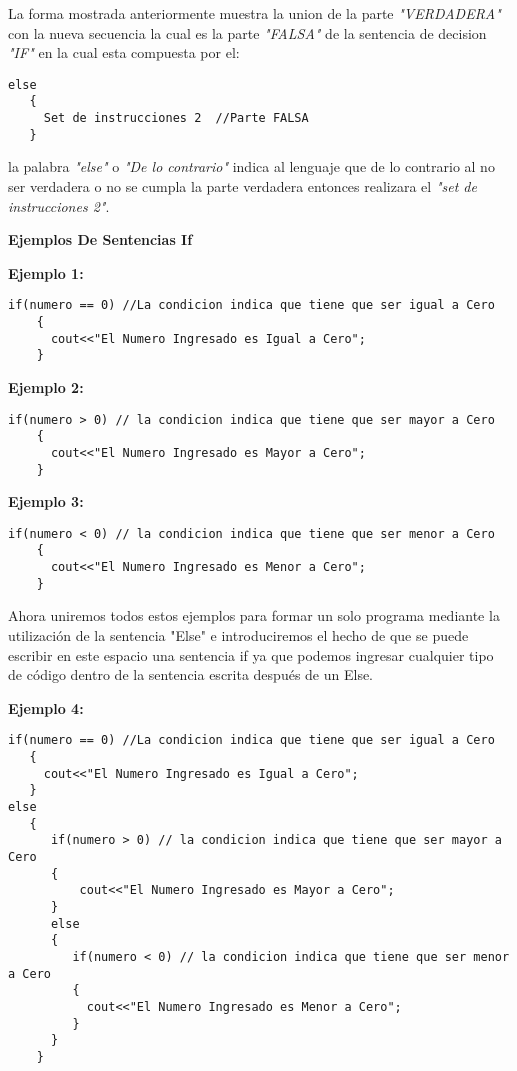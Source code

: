 La forma mostrada anteriormente muestra la union de la parte \textit{"VERDADERA"} con la nueva secuencia la cual es la parte \textit{"FALSA"} de la sentencia de decision \textit{"IF"} en la cual esta compuesta por el:

\begin{lstlisting}[style=Cpp, label=sintaxis-else, caption=Sintaxis Else]
else
   {
     Set de instrucciones 2  //Parte FALSA
   }
\end{lstlisting}

la palabra \textit{"else"} o \textit{"De lo contrario"} indica al lenguaje que de lo contrario al no ser verdadera o no se cumpla la parte verdadera entonces realizara el \textit{"set de instrucciones 2"}.

\begin{center}
	\textbf{Ejemplos De Sentencias If}
\end{center}

\textbf{Ejemplo 1:}

\begin{lstlisting}[style=Cpp, label=if-ejemplo-1, caption=If Ejemplo 1]
if(numero == 0) //La condicion indica que tiene que ser igual a Cero
    {
      cout<<"El Numero Ingresado es Igual a Cero";
    }
\end{lstlisting}

\textbf{Ejemplo 2:}

\begin{lstlisting}[style=Cpp, label=if-ejemplo-2, caption=If Ejemplo 2]
if(numero > 0) // la condicion indica que tiene que ser mayor a Cero
    {    
      cout<<"El Numero Ingresado es Mayor a Cero";
    }
\end{lstlisting}

\textbf{Ejemplo 3:}

\begin{lstlisting}[style=Cpp, label=if-ejemplo-3, caption=If Ejemplo 3]
if(numero < 0) // la condicion indica que tiene que ser menor a Cero
    {    
      cout<<"El Numero Ingresado es Menor a Cero";
    }
\end{lstlisting}

Ahora uniremos todos estos ejemplos para formar un solo programa mediante la utilización de la sentencia "Else" e introduciremos el hecho de que se puede escribir en este espacio una sentencia if ya que podemos ingresar cualquier tipo de código dentro de la sentencia escrita después de un Else.

\textbf{Ejemplo 4:}

\begin{lstlisting}[style=Cpp, label=if-ejemplo-4, caption=If Ejemplo 4]
if(numero == 0) //La condicion indica que tiene que ser igual a Cero
   {
     cout<<"El Numero Ingresado es Igual a Cero";
   }
else
   {
      if(numero > 0) // la condicion indica que tiene que ser mayor a Cero
      {    
          cout<<"El Numero Ingresado es Mayor a Cero";
      }
      else
      {
         if(numero < 0) // la condicion indica que tiene que ser menor a Cero
         {    
           cout<<"El Numero Ingresado es Menor a Cero";
         }
      }
    }
\end{lstlisting}


